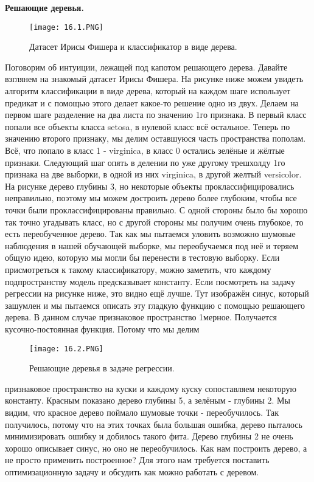 \textbf{Решающие деревья.} 

\begin{figure}[H]
\centering
\texttt{[image: 16.1.PNG]}
\caption{Датасет Ирисы Фишера и классификатор в виде дерева.}
\end{figure}

Поговорим об интуиции, лежащей под капотом решающего дерева. Давайте взглянем на знакомый датасет Ирисы Фишера. На рисунке ниже можем увидеть алгоритм классификации в виде дерева, который на каждом шаге использует предикат и с помощью этого делает какое-то решение одно из двух. Делаем на первом шаге разделение на два листа по значению 1го признака. В первый класс попали все объекты класса setosa, в нулевой класс всё остальное. Теперь по значению второго признаку, мы делим оставшуюся часть пространства пополам. Всё, что попало в класс 1 - virginica, в класс 0 остались зелёные и жёлтые признаки. Следующий шаг опять в делении по уже другому трешхолду 1го признака на две выборки, в одной из них virginica, в другой желтый versicolor. На рисунке дерево глубины 3, но некоторые объекты проклассифицировались неправильно,
поэтому мы можем достроить дерево более глубоким, чтобы все точки были проклассифицированы правильно. С одной стороны было бы хорошо так точно угадывать класс, но с другой стороны мы получим очень глубокое, то есть переобученное дерево. Так как мы пытаемся уловить возможно шумовые наблюдения в нашей обучающей выборке, мы переобучаемся под неё и теряем общую идею, которую мы могли бы перенести в тестовую выборку. Если присмотреться к такому классификатору, можно заметить, что каждому подпространству модель предсказывает константу. Если посмотреть на задачу регрессии на рисунке ниже, это видно ещё лучше. Тут изображён синус, который зашумлен и мы пытаемся описать эту гладкую функцию с помощью решающего дерева. В данном случае признаковое пространство 1мерное. Получается кусочно-постоянная функция. Потому что мы делим

\begin{figure}[h]
\centering
\texttt{[image: 16.2.PNG]}
\caption{Решающие деревья в задаче регрессии.}
\end{figure}

признаковое пространство на куски и каждому куску сопоставляем некоторую константу. Красным показано дерево глубины 5, а зелёным - глубины 2. Мы видим, что красное дерево поймало шумовые точки - переобучилось. Так получилось, потому что на этих точках была большая ошибка, дерево пыталось минимизировать
ошибку и добилось такого фита. Дерево глубины 2 не очень хорошо описывает синус, но оно не переобучилось. Как нам построить дерево, а не просто применить построенное? Для этого нам требуется поставить оптимизационную задачу и обсудить как можно работать с деревом.

